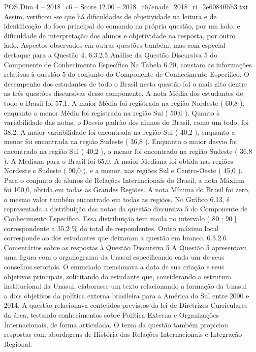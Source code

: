 \begin{textsample}{POS Dim 4 – 2018\_c6 – Score 12.00 – 2018\_c6/enade\_2018\_ri\_2e60840bb3.txt}
Assim, verificou -se que há dificuldades de objetividade na leitura e de identificação do foco principal do comando na própria questão, por um lado, e dificuldade de interpretação dos alunos e objetividade na resposta, por outro lado.
Aspectos observados em outras questões também, mas com especial destaque para a Questão 4. 6.3.2.5 Análise da Questão Discursiva 5 do Componente de Conhecimento Específico Na Tabela 6.20, constam as informações relativas à questão 5 do conjunto do Componente de Conhecimento Específico.
O desempenho dos estudantes de todo o Brasil nesta questão foi o mais alto dentre as três questões discursivas desse componente.
A nota Média dos estudantes de todo o Brasil foi 57,1.
A maior Média foi registrada na região Nordeste ( 60,8 ), enquanto a menor Média foi registrada na região Sul ( 50,0 ).
Quanto à variabilidade das notas, o Desvio padrão dos alunos do Brasil, como um todo, foi 38,2.
A maior variabilidade foi encontrada na região Sul ( 40,2 ), enquanto a menor foi encontrada na região Sudeste ( 36,8 ).
Enquanto o maior desvio foi encontrado na região Sul ( 40,2 ), o menor foi encontrado na região Sudeste ( 36,8 ).
A Mediana para o Brasil foi 65,0.
A maior Mediana foi obtida nas regiões Nordeste e Sudeste ( 90,0 ), e a menor, nas regiões Sul e Centro-Oeste ( 45,0 ).
Para o conjunto de alunos de Relações Internacionais do Brasil, a nota Máxima foi 100,0, obtida em todas as Grandes Regiões.
A nota Mínima do Brasil foi zero, o mesmo valor também encontrado em todas as regiões.
No Gráfico 6.13, é representada a distribuição das notas da questão discursiva 5 do Componente de Conhecimento Específico.
Essa distribuição tem moda no intervalo ( 80 ; 90 ] correspondente a 35,2 \% do total de respondentes.
Outro máximo local corresponde ao dos estudantes que deixaram a questão em branco. 6.3.2.6 Comentários sobre as respostas à Questão Discursiva 5 A Questão 5 apresentava uma figura com o organograma da Unasul especificando cada um de seus conselhos setoriais.
O enunciado mencionava a data de sua criação e seus objetivos principais, solicitando do estudante que, considerando a estrutura institucional da Unasul, elaborasse um texto relacionando a formação da Unasul a dois objetivos da política externa brasileira para a América do Sul entre 2000 e 2014.
A questão relacionava conteúdos previstos da lei de Diretrizes Curriculares da área, testando conhecimentos sobre Política Externa e Organizações Internacionais, de forma articulada.
O tema da questão também propiciou respostas com abordagens de História das Relações Internacionais e Integração Regional.

\end{textsample}

